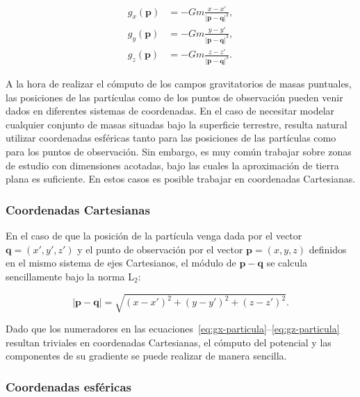 \begin{align}
    g_x(\mathbf{p}) &=
        - G m
        \frac{x - x'}{|\mathbf{p} - \mathbf{q}|^3},
    \label{eq:gx-particula}
    \\
    g_y(\mathbf{p}) &=
        - G m
        \frac{y - y'}{|\mathbf{p} - \mathbf{q}|^3},
    \label{eq:gy-particula}
    \\
    g_z(\mathbf{p}) &=
        - G m
        \frac{z - z'}{|\mathbf{p} - \mathbf{q}|^3}.
    \label{eq:gz-particula}
\end{align}

A la hora de realizar el cómputo de los campos gravitatorios de masas
puntuales, las posiciones de las partículas como de los puntos de observación
pueden venir dados en diferentes sistemas de coordenadas.
En el caso de necesitar modelar cualquier conjunto de masas situadas bajo la
superficie terrestre, resulta natural utilizar coordenadas esféricas tanto para
las posiciones de las partículas como para los puntos de observación.
Sin embargo, es muy común trabajar sobre zonas de estudio con dimensiones
acotadas, bajo las cuales la aproximación de tierra plana es suficiente. En
estos casos es posible trabajar en coordenadas Cartesianas.

\subsubsection{Coordenadas Cartesianas}

En el caso de que la posición de la partícula venga dada por el vector
$\mathbf{q} = (x', y', z')$ y el punto de observación por el vector
$\mathbf{p} = (x, y, z)$ definidos en el mismo sistema de ejes Cartesianos, el
módulo de
$\mathbf{p} - \mathbf{q}$ se calcula sencillamente bajo la norma L$_2$:

\begin{equation}
    | \mathbf{p} - \mathbf{q} | = \sqrt{
        (x - x')^2 + (y - y')^2 + (z - z')^2
    }.
\end{equation}

Dado que los numeradores en las
ecuaciones~\ref{eq:gx-particula}--\ref{eq:gz-particula} resultan triviales en
coordenadas Cartesianas, el cómputo del potencial y las componentes de su
gradiente se puede realizar de manera sencilla.

\subsubsection{Coordenadas esféricas}

